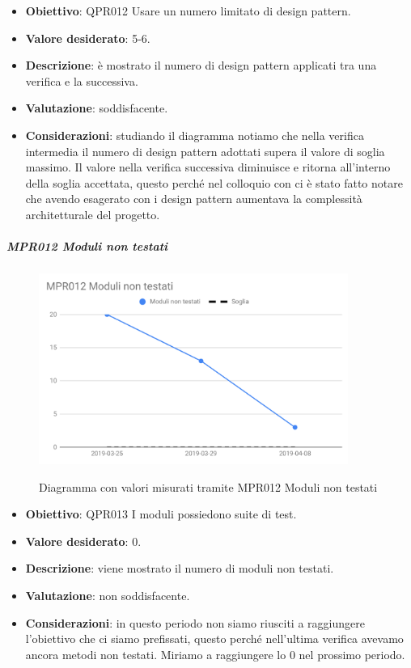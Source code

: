 	\begin{itemize}
		\item \textbf{Obiettivo}: QPR012 Usare un numero limitato di design pattern.
		\item \textbf{Valore desiderato}: 5-6.
		\item \textbf{Descrizione}: è mostrato il numero di design pattern applicati tra una verifica e la successiva.
		\item \textbf{Valutazione}: soddisfacente.
		\item \textbf{Considerazioni}: studiando il diagramma notiamo che nella verifica intermedia il numero di design
		pattern adottati supera il valore di soglia massimo. Il valore nella verifica successiva diminuisce e ritorna
		all'interno della soglia accettata, questo perché nel colloquio con \RC ci è stato fatto notare che avendo
		esagerato con i design pattern aumentava la complessità architetturale del progetto.
	\end{itemize}

		\subparagraph{MPR012 Moduli non testati}
	
	\begin{figure}[H]
		\centering
		\includegraphics[width=0.9\textwidth]{img/cruscotti/RQ/MPR012.png}
		\label{immagineModuliNonTestatiRQ}
		\caption{Diagramma con valori misurati tramite MPR012 Moduli non testati}
	\end{figure}
	
	\begin{itemize}
		\item \textbf{Obiettivo}: QPR013 I moduli possiedono suite di test.
		\item \textbf{Valore desiderato}: 0.
		\item \textbf{Descrizione}: viene mostrato il numero di moduli non testati.
		\item \textbf{Valutazione}: non soddisfacente.
		\item \textbf{Considerazioni}: in questo periodo non siamo riusciti a raggiungere l'obiettivo che ci siamo prefissati, questo perché nell'ultima verifica avevamo ancora metodi non testati. Miriamo a raggiungere lo 0 nel prossimo periodo.
	\end{itemize}
	
